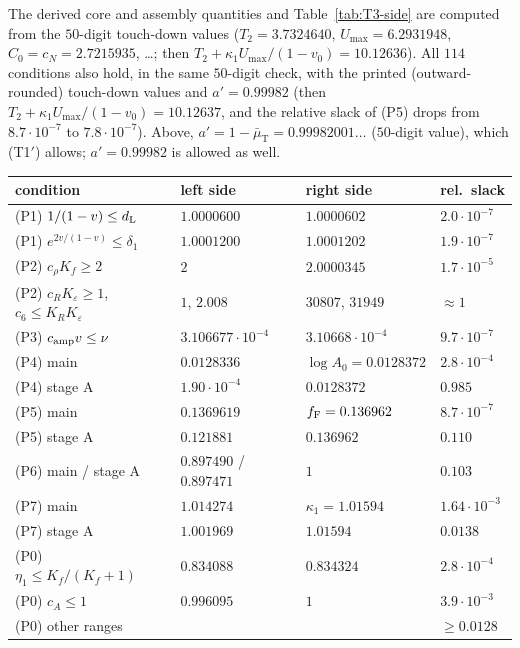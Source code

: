 \begin{table}[p]
{The derived core and assembly quantities and Table~\ref{tab:T3-side} are computed from the $50$-digit touch-down values
($T_2=3.7324640$, $U_{\max}=6.2931948$, $C_0=c_N=2.7215935$, \dots; then $T_2+\kappa_1U_{\max}/(1-v_0)=10.12636$). All $114$
conditions also hold, in the same $50$-digit check, with the printed (outward-rounded) touch-down values and $a'=0.99982$ (then
$T_2+\kappa_1U_{\max}/(1-v_0)=10.12637$, and the relative slack of (P5) drops from $8.7\cdot10^{-7}$ to $7.8\cdot10^{-7}$).
Above, $a'=1-\bar\mu_{\mathrm T}=0.99982001\ldots$ ($50$-digit value), which (T1$'$) allows; $a'=0.99982$ is allowed as well.}\label{tab:T3-const}
\end{table}

\begin{table}[p]
\centering\footnotesize\setlength{\tabcolsep}{4pt}
\begin{tabular}{@{}llll@{}}
\toprule
condition & left side & right side & rel.\ slack\\
\midrule
(P1) $1/(1-v)\le d_{\mathrm L}$ & $1.0000600$ & $1.0000602$ & $2.0\cdot10^{-7}$\\
(P1) $e^{2v/(1-v)}\le\delta_1$ & $1.0001200$ & $1.0001202$ & $1.9\cdot10^{-7}$\\
(P2) $c_\rho K_f\ge2$ & $2$ & $2.0000345$ & $1.7\cdot10^{-5}$\\
(P2) $c_RK_\varepsilon\ge1$, $c_6\le K_RK_\varepsilon$ & $1$, $2.008$ & $30807$, $31949$ & $\approx1$\\
(P3) $c_{\mathrm{amp}} v\le\nu$ & $3.106677\cdot10^{-4}$ & $3.10668\cdot10^{-4}$ & $9.7\cdot10^{-7}$\\
(P4) main & $0.0128336$ & $\log A_0=0.0128372$ & $2.8\cdot10^{-4}$\\
(P4) stage A & $1.90\cdot10^{-4}$ & $0.0128372$ & $0.985$\\
(P5) main & $0.1369619$ & $f_{\mathrm F}=0.136962$ & $8.7\cdot10^{-7}$\\
(P5) stage A & $0.121881$ & $0.136962$ & $0.110$\\
(P6) main / stage A & $0.897490$ / $0.897471$ & $1$ & $0.103$\\
(P7) main & $1.014274$ & $\kappa_1=1.01594$ & $1.64\cdot10^{-3}$\\
(P7) stage A & $1.001969$ & $1.01594$ & $0.0138$\\
(P0) $\eta_1\le K_f/(K_f+1)$ & $0.834088$ & $0.834324$ & $2.8\cdot10^{-4}$\\
(P0) $c_A\le1$ & $0.996095$ & $1$ & $3.9\cdot10^{-3}$\\
(P0) other ranges & & & $\ge0.0128$\\

\end{tabular}
\end{table}

